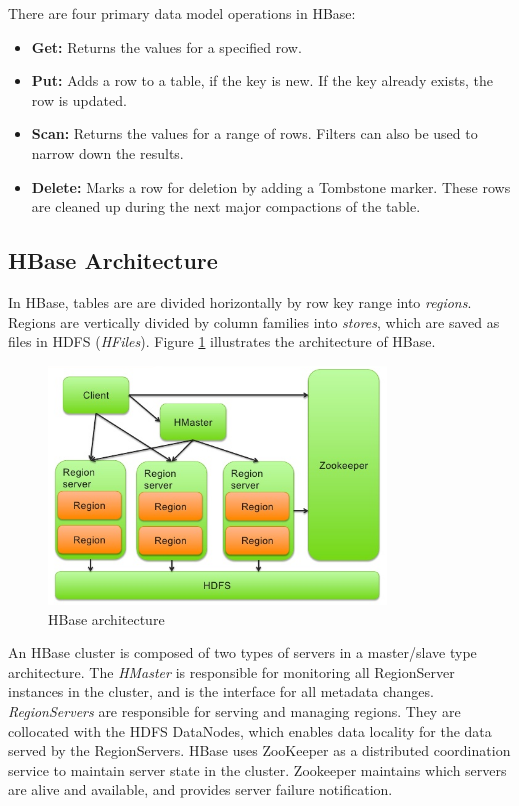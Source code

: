 There are four primary data model operations in HBase:
\begin{itemize}
\item \textbf{Get:} Returns the values for a specified row.
\item \textbf{Put:} Adds a row to a table, if the key is new. If the key already exists, the row is updated.
\item \textbf{Scan:} Returns the values for a range of rows. Filters can also be used to narrow down the results.
\item \textbf{Delete:} Marks a row for deletion by adding a Tombstone marker. These rows are cleaned up during the next major compactions of the table.
\end{itemize}

\subsection{HBase Architecture}

In HBase, tables are are divided horizontally by row key range into \emph{regions}. Regions are vertically divided by column families into \emph{stores}, which are saved as files in HDFS (\emph{HFiles}). Figure \ref{figure:hbase_architecture} illustrates the architecture of HBase.

\begin{figure}[H]
\centering
\includegraphics[width=0.8\textwidth]{figures/hbase_architecture}
\caption{HBase architecture}
\label{figure:hbase_architecture}
\end{figure}

An HBase cluster is composed of two types of servers in a master/slave type architecture. The \emph{HMaster} is responsible for monitoring all RegionServer instances in the cluster, and is the interface for all metadata changes. \emph{RegionServers} are responsible for serving and managing regions. They are collocated with the HDFS DataNodes, which enables data locality for the data served by the RegionServers. HBase uses ZooKeeper as a distributed coordination service to maintain server state in the cluster. Zookeeper maintains which servers are alive and available, and provides server failure notification.


